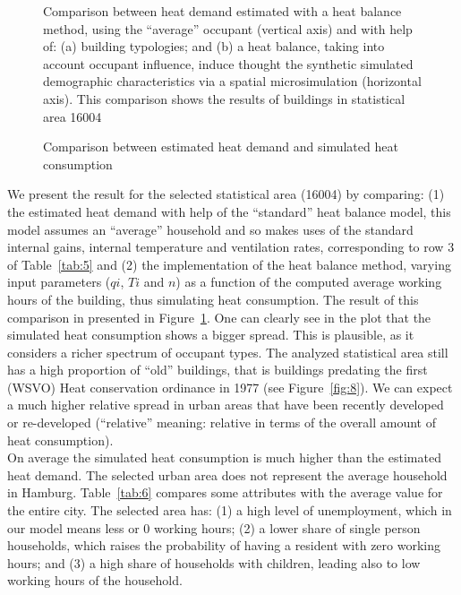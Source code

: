 \documentclass[11pt]{IJM-article}
\begin{document}
\begin{figure}[htb] 
    \centering 
    \caption{Comparison between estimated heat demand and simulated heat
    consumption}
    \label{fig:7}
    \begin{flushleft}
    \begin{footnotesize}
        Comparison between heat demand estimated with a heat balance method,
        using the ``average'' occupant (vertical axis) and with help of: (a)
        building typologies; and (b) a heat balance, taking into account
        occupant influence, induce thought the synthetic simulated demographic
        characteristics via a spatial microsimulation (horizontal axis). This
        comparison shows the results of buildings in statistical area 16004
    \end{footnotesize}
    \end{flushleft}
\end{figure}

We present the result for the selected statistical area (16004) by comparing:
(1) the estimated heat demand with help of the ``standard'' heat balance model,
this model assumes an ``average'' household and so makes uses of the standard
internal gains, internal temperature and ventilation rates, corresponding to
row 3 of Table~\ref{tab:5} and (2) the implementation of the heat balance
method, varying input parameters ($qi$, $Ti$ and $n$) as a function of the
computed average working hours of the building, thus simulating heat
consumption. The result of this comparison in presented in Figure~\ref{fig:7}.
One can clearly see in the plot that the simulated heat consumption shows a
bigger spread. This is plausible, as it considers a richer spectrum of occupant
types. The analyzed statistical area still has a high proportion of ``old''
buildings, that is buildings predating the first (WSVO) Heat conservation
ordinance in 1977 (see Figure~\ref{fig:8}). We can expect a much higher
relative spread in urban areas that have been recently developed or
re-developed (``relative'' meaning: relative in terms of the overall amount of
heat consumption).\\

On average the simulated heat consumption is much higher than the estimated
heat demand. The selected urban area does not represent the average household
in Hamburg.  Table~\ref{tab:6} compares some attributes with the average value
for the entire city. The selected area has: (1) a high level of unemployment,
which in our model means less or 0 working hours; (2) a lower share of single
person households, which raises the probability of having a resident with zero
working hours; and (3) a high share of households with children, leading also
to low working hours of the household.\\
\end{document}
